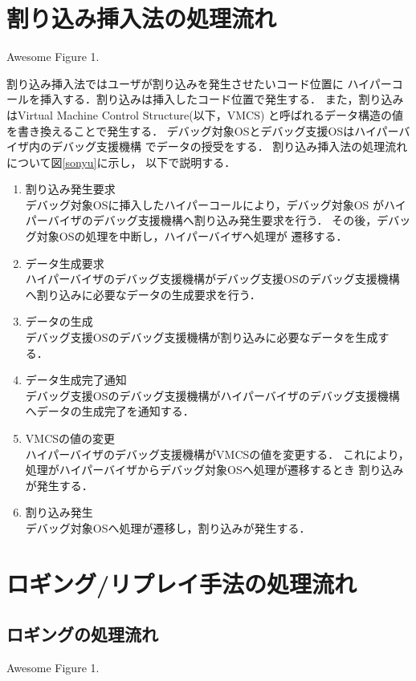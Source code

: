 \documentclass[tanilab-enum]{graduate}
\begin{document}
\section{割り込み挿入法の処理流れ}
{Awesome Figure 1.}

割り込み挿入法ではユーザが割り込みを発生させたいコード位置に
ハイパーコールを挿入する．割り込みは挿入したコード位置で発生する．
また，割り込みはVirtual Machine Control Structure(以下，VMCS)
と呼ばれるデータ構造の値を書き換えることで発生する．
デバッグ対象OSとデバッグ支援OSはハイパーバイザ内のデバッグ支援機構
でデータの授受をする．
割り込み挿入法の処理流れについて図\ref{sonyu}に示し，
以下で説明する．
\begin{enumerate}
    \item 割り込み発生要求\\
        デバッグ対象OSに挿入したハイパーコールにより，デバッグ対象OS
        がハイパーバイザのデバッグ支援機構へ割り込み発生要求を行う．
        その後，デバッグ対象OSの処理を中断し，ハイパーバイザへ処理が
        遷移する．
    \item データ生成要求\\
        ハイパーバイザのデバッグ支援機構がデバッグ支援OSのデバッグ支援機構
        へ割り込みに必要なデータの生成要求を行う．
    \item データの生成\\
        デバッグ支援OSのデバッグ支援機構が割り込みに必要なデータを生成する．
    \item データ生成完了通知\\
        デバッグ支援OSのデバッグ支援機構がハイパーバイザのデバッグ支援機構
        へデータの生成完了を通知する．
    \item VMCSの値の変更\\
        ハイパーバイザのデバッグ支援機構がVMCSの値を変更する．
        これにより，処理がハイパーバイザからデバッグ対象OSへ処理が遷移するとき
        割り込みが発生する．
    \item 割り込み発生\\
        デバッグ対象OSへ処理が遷移し，割り込みが発生する．
\end{enumerate}

\section{ロギング/リプレイ手法の処理流れ}
\subsection{ロギングの処理流れ}
{Awesome Figure 1.}
\end{document}
